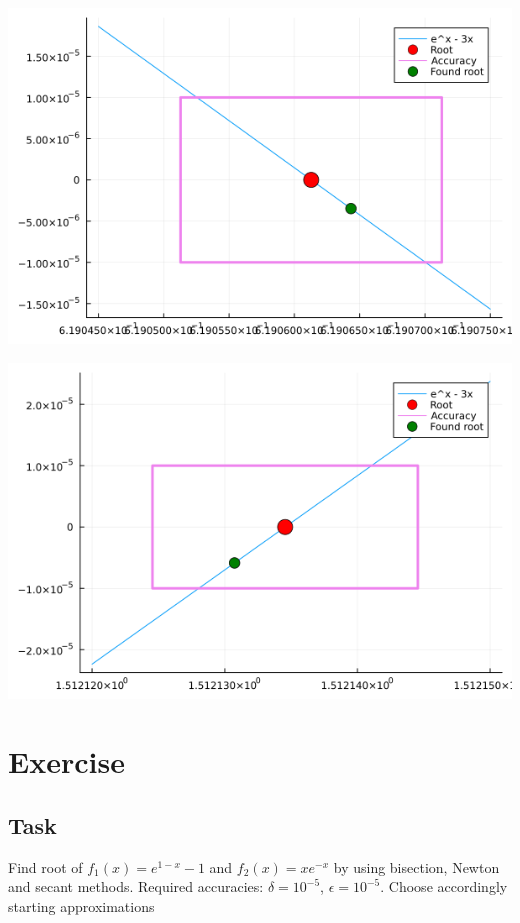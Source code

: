 \documentclass[11pt]{article}
\begin{document}
\begin{minipage}{0.8\linewidth}
\begin{minipage}{0.4\linewidth}
    \includegraphics[scale=0.4]{resources/ex5_plot_1}
\end{minipage}
\hfill
\begin{minipage}{0.4\linewidth}
    \includegraphics[scale=0.4]{resources/ex5_plot_2}
\end{minipage}
\end{minipage}
\section{Exercise}
\subsection{Task}
Find root of $f_1(x) = e^{1-x} - 1$ and $f_2(x) = xe^{-x}$ by using bisection, Newton and secant methods. Required accuracies: $\delta=10^{-5}$, $\epsilon=10^{-5}$. Choose accordingly starting approximations
\end{document}
